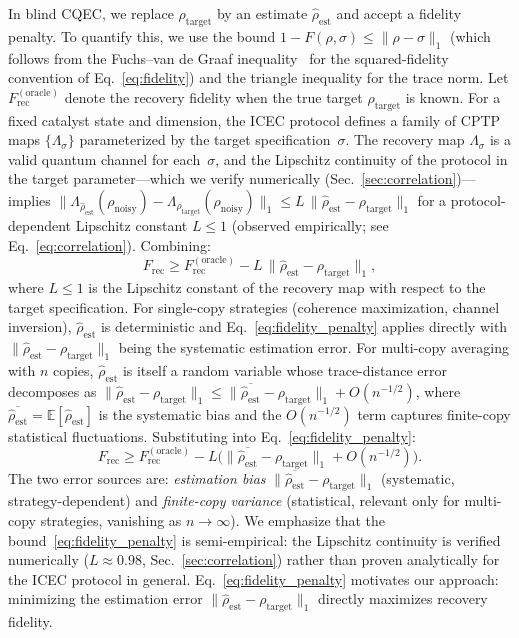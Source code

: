 \documentclass[prx,twocolumn,superscriptaddress,longbibliography,floatfix]{revtex4-2}
\newcommand{\Frec}{F_\mathrm{rec}}
\newcommand{\rhot}{\rho_\mathrm{target}}
\newcommand{\rhon}{\rho_\mathrm{noisy}}
\newcommand{\rhoe}{\hat{\rho}_\mathrm{est}}
\begin{document}
In blind CQEC, we replace $\rhot$ by an estimate $\rhoe$ and accept a fidelity penalty.
To quantify this, we use the bound $1 - F(\rho,\sigma) \leq \|\rho - \sigma\|_1$ (which follows from the Fuchs--van de Graaf inequality~\cite{FuchsGraaf1999} for the squared-fidelity convention of Eq.~\eqref{eq:fidelity}) and the triangle inequality for the trace norm.
Let $\Frec^{(\mathrm{oracle})}$ denote the recovery fidelity when the true target $\rhot$ is known.
For a fixed catalyst state and dimension, the ICEC protocol defines a family of CPTP maps $\{\Lambda_\sigma\}$ parameterized by the target specification~$\sigma$.
The recovery map $\Lambda_\sigma$ is a valid quantum channel for each~$\sigma$, and the Lipschitz continuity of the protocol in the target parameter---which we verify numerically (Sec.~\ref{sec:correlation})---implies
$\|\Lambda_{\rhoe}(\rhon) - \Lambda_{\rhot}(\rhon)\|_1 \leq L\,\|\rhoe - \rhot\|_1$
for a protocol-dependent Lipschitz constant $L \leq 1$ (observed empirically; see Eq.~\eqref{eq:correlation}).
Combining:
\begin{equation}
\Frec \geq \Frec^{(\mathrm{oracle})} - L\,\|\rhoe - \rhot\|_1,
\label{eq:fidelity_penalty}
\end{equation}
where $L \leq 1$ is the Lipschitz constant of the recovery map with respect to the target specification.
For single-copy strategies (coherence maximization, channel inversion), $\rhoe$ is deterministic and Eq.~\eqref{eq:fidelity_penalty} applies directly with $\|\rhoe - \rhot\|_1$ being the systematic estimation error.
For multi-copy averaging with $n$ copies, $\rhoe$ is itself a random variable whose trace-distance error decomposes as $\|\rhoe - \rhot\|_1 \leq \|\overline{\rhoe} - \rhot\|_1 + O(n^{-1/2})$, where $\overline{\rhoe} = \mathbb{E}[\rhoe]$ is the systematic bias and the $O(n^{-1/2})$ term captures finite-copy statistical fluctuations.
Substituting into Eq.~\eqref{eq:fidelity_penalty}:
\begin{equation}
\Frec \geq \Frec^{(\mathrm{oracle})} - L\bigl(\|\overline{\rhoe} - \rhot\|_1 + O(n^{-1/2})\bigr).
\label{eq:fidelity_penalty_multicopy}
\end{equation}
The two error sources are: \emph{estimation bias} $\|\overline{\rhoe} - \rhot\|_1$ (systematic, strategy-dependent) and \emph{finite-copy variance} (statistical, relevant only for multi-copy strategies, vanishing as $n \to \infty$).
We emphasize that the bound~\eqref{eq:fidelity_penalty} is semi-empirical: the Lipschitz continuity is verified numerically ($L \approx 0.98$, Sec.~\ref{sec:correlation}) rather than proven analytically for the ICEC protocol in general.
Eq.~\eqref{eq:fidelity_penalty} motivates our approach: minimizing the estimation error $\|\rhoe - \rhot\|_1$ directly maximizes recovery fidelity.
\end{document}
